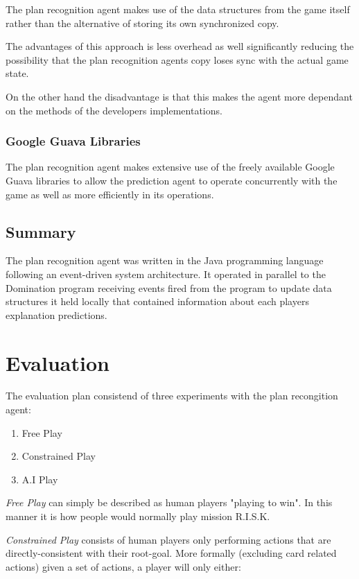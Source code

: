 \documentclass[parskip]{cs4rep}
\begin{document}
The plan recognition agent makes use of the data structures from the game itself rather than the alternative of storing its own synchronized copy.

The advantages of this approach is less overhead as well significantly reducing the possibility that the plan recognition agents copy loses sync with the actual game state. 

On the other hand the disadvantage is that this makes the agent more dependant on the methods of the developers implementations.

\subsection{Google Guava Libraries}

The plan recognition agent makes extensive use of the freely available Google Guava libraries to allow the prediction agent to operate concurrently with the game as well as more efficiently in its operations.

\section{Summary}

The plan recognition agent was written in the Java programming language following an event-driven system architecture. It operated in parallel to the Domination program receiving events fired from the program to update data structures it held locally that contained information about each players explanation predictions.

\chapter{Evaluation} 

The evaluation plan consistend of three experiments with the plan recongition agent:

\begin{enumerate}
\item
Free Play
\item
Constrained Play
\item
A.I Play
\end{enumerate}

\textit{Free Play} can simply be described as human players "playing to win". In this manner it is how people would normally play mission R.I.S.K.

\textit{Constrained Play} consists of human players only performing actions that are directly-consistent with their root-goal.  More formally (excluding card related actions) given a set of actions, a player will only either:
\end{document}
